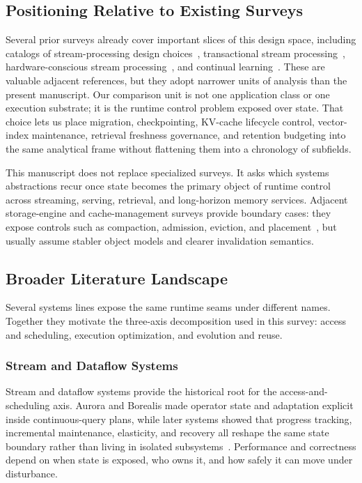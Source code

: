 \documentclass[manuscript,nonacm]{acmart}
\begin{document}
\subsection{Positioning Relative to Existing Surveys}

Several prior surveys already cover important slices of this design space, including catalogs of stream-processing design choices~\cite{hirzel2014catalog,cugola2012processing}, transactional stream processing~\cite{zhang2024survey}, hardware-conscious stream processing~\cite{zhang2020hardware}, and continual learning~\cite{delange2021survey}. These are valuable adjacent references, but they adopt narrower units of analysis than the present manuscript. Our comparison unit is not one application class or one execution substrate; it is the runtime control problem exposed over state. That choice lets us place migration, checkpointing, KV-cache lifecycle control, vector-index maintenance, retrieval freshness governance, and retention budgeting into the same analytical frame without flattening them into a chronology of subfields.

This manuscript does not replace specialized surveys. It asks which systems abstractions recur once state becomes the primary object of runtime control across streaming, serving, retrieval, and long-horizon memory services. Adjacent storage-engine and cache-management surveys provide boundary cases: they expose controls such as compaction, admission, eviction, and placement~\cite{luo2020lsm,ali2011survey}, but usually assume stabler object models and clearer invalidation semantics.

\subsection{Broader Literature Landscape}

Several systems lines expose the same runtime seams under different names. Together they motivate the three-axis decomposition used in this survey: access and scheduling, execution optimization, and evolution and reuse.

\subsubsection{Stream and Dataflow Systems}

Stream and dataflow systems provide the historical root for the access-and-scheduling axis. Aurora and Borealis made operator state and adaptation explicit inside continuous-query plans, while later systems showed that progress tracking, incremental maintenance, elasticity, and recovery all reshape the same state boundary rather than living in isolated subsystems~\cite{abadi2003aurora,abadi2005borealis,carbone2015flink,carbone2015asynchronous,chandramouli2014trill,armbrust2018structured,murray2013differential,gulisano2012streamcloud}. Performance and correctness depend on when state is exposed, who owns it, and how safely it can move under disturbance.
\end{document}
